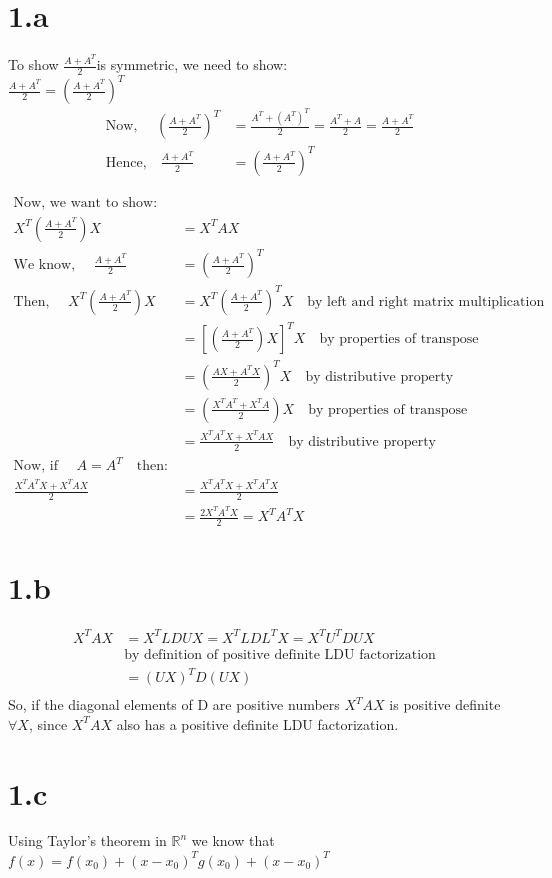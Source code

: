 \documentclass[letterpaper,12pt,titlepage,oneside,final]{book}
\newcommand{\R}{\mathbb{R}}
\begin{document}





\section*{1.a}
To show \quad $\frac{A + A^T}{2}$\quad is symmetric, we need to show: \\
$\frac{A + A^T}{2} = \left(\frac{A + A^T}{2} \right)^T$ \\
\begin{align*}
\text{Now, }\quad \left(\frac{A + A^T}{2} \right)^T 
&= \frac{A^T + (A^T)^T}{2} 
= \frac{A^T + A}{2}
= \frac{A + A^T}{2}\\
\text{Hence,}\quad
\frac{A + A^T}{2} &= \left(\frac{A + A^T}{2} \right)^T
\end{align*}

\begin{align*}
\text{Now, we want to show: }\\
X^T\left(\frac{A + A^T}{2}\right)X &= X^TAX\\
\text{We know, }\quad \frac{A + A^T}{2} &= \left(\frac{A + A^T}{2} \right)^T\\
\text{Then, }\quad 
X^T\left(\frac{A + A^T}{2}\right)X&= X^T\left(\frac{A + A^T}{2} \right)^T X\quad \text{by left and right matrix multiplication}\\
&=\left[\left(\frac{A + A^T}{2} \right)X\right]^T X \quad\text{by properties of transpose}\\
&= \left(\frac{AX + A^TX}{2} \right)^T X \quad\text{by distributive property}\\
&= \left(\frac{X^T A^T + X^T A}{2}\right)X\quad\text{by properties of transpose}\\
&=\frac{X^T A^T X + X^T A X}{2}\quad\text{by distributive property}\\
\text{Now, if }\quad A = A^T\quad\text{then: }\\
\frac{X^T A^T X + X^T A X}{2}
&=\frac{X^T A^T X + X^T A^T X}{2}\\
& = \frac{2X^T A^T X}{2} = X^T A^T X 
\end{align*}

\cleardoublepage

\section*{1.b}
\begin{align*}
X^T A X &= X^TLDUX = X^TLDL^TX = X^TU^TDUX\\
&\text{by definition of positive definite LDU factorization}&\\
& =(UX)^T D (UX)\\
\end{align*}
So, if the diagonal elements of D are positive numbers $X^T A X$ is positive definite $\forall X$, since $X^T A X$ also has a positive definite LDU factorization.


\section*{1.c}
Using Taylor's theorem in $\R ^n$ we know that $f(x) = f(x_0) + (x-x_0)^Tg(x_0) + (x-x_0)^T$
\end{document}
